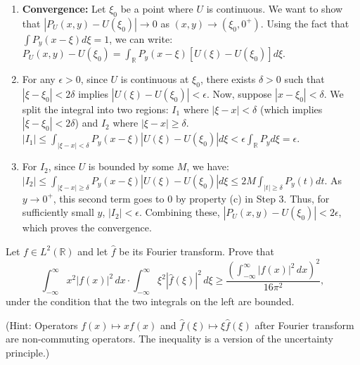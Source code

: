 \begin{solution}
\begin{enumerate}
    \item \textbf{Convergence:} Let $\xi_0$ be a point where $U$ is continuous. We want to show that $|P_U(x,y) - U(\xi_0)| \to 0$ as $(x,y) \to (\xi_0, 0^+)$.
    Using the fact that $\int P_y(x-\xi) d\xi = 1$, we can write:
    $P_U(x,y) - U(\xi_0) = \int_{\mathbb{R}} P_y(x-\xi) [U(\xi) - U(\xi_0)] d\xi$.

    \item For any $\epsilon > 0$, since $U$ is continuous at $\xi_0$, there exists $\delta > 0$ such that $|\xi - \xi_0| < 2\delta$ implies $|U(\xi) - U(\xi_0)| < \epsilon$.
    Now, suppose $|x - \xi_0| < \delta$. We split the integral into two regions: $I_1$ where $|\xi - x| < \delta$ (which implies $|\xi - \xi_0| < 2\delta$) and $I_2$ where $|\xi - x| \geq \delta$.
    $|I_1| \leq \int_{|\xi-x|<\delta} P_y(x-\xi) |U(\xi) - U(\xi_0)| d\xi < \epsilon \int_{\mathbb{R}} P_y d\xi = \epsilon$.

    \item For $I_2$, since $U$ is bounded by some $M$, we have:
    $|I_2| \leq \int_{|\xi-x| \geq \delta} P_y(x-\xi) |U(\xi) - U(\xi_0)| d\xi \leq 2M \int_{|t| \geq \delta} P_y(t) dt$.
    As $y \to 0^+$, this second term goes to $0$ by property (c) in Step 3. Thus, for sufficiently small $y$, $|I_2| < \epsilon$.
    Combining these, $|P_U(x,y) - U(\xi_0)| < 2\epsilon$, which proves the convergence.
\end{enumerate}
\end{solution}

\begin{exercise}
\label{analysis:2014:5}
Let $f\in L^2(\mathbb{R})$ and let $\hat{f}$ be its Fourier transform. Prove that
\[
\int_{-\infty}^{\infty} x^2|f(x)|^2\,dx \cdot \int_{-\infty}^{\infty} \xi^2|\hat{f}(\xi)|^2\,d\xi \geq \frac{\left(\int_{-\infty}^{\infty}|f(x)|^2\,dx\right)^2}{16\pi^2},
\]
under the condition that the two integrals on the left are bounded.

(Hint: Operators $f(x)\mapsto xf(x)$ and $\hat{f}(\xi)\mapsto\xi\hat{f}(\xi)$ after Fourier transform are non-commuting operators. The inequality is a version of the uncertainty principle.)
\end{exercise}

